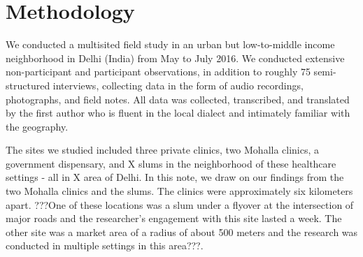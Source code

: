 \section{Methodology}

\begin{comment}
This should tell the story of what you did, and the single most important point is to show that you were reflective, rigorous, ethical, sound in your research. 
Start with where you conducted the study. Was there one site or many? How long was your (the authorsâ) engagement with this site? What was the nature of the engagement? And remember to anonymize by default.
Say what methods you used and who you studied. How long were your interviews? What kinds of questions did you ask? Did you use an interpreter? Who were these people? How old?
Add a paragraph on who the authors are and what they bring to the table. Say what their biases might have been that could be limitations of this work. Was there access you could not get? 
How did you analyze the data? If you used grounded theory, whose version of grounded theory did you use? Who was responsible for the analysis? 
Finally, there are lots of papers that have a decent write-up for methodology. Find a researcher you like and read up on the Methodology section.
\end{comment}

We conducted a multisited field study in an urban but low-to-middle income neighborhood in Delhi (India) from May to July 2016. We conducted extensive non-participant and participant observations, in addition to roughly 75 semi-structured interviews, collecting data in the form of audio recordings, photographs, and field notes. All data was collected, transcribed, and translated by the first author who is fluent in the local dialect and intimately familiar with the geography. 

The sites we studied included three private clinics, two Mohalla clinics, a government dispensary, and X slums in the neighborhood of these healthcare settings - all in X area of Delhi. In this note, we draw on our findings from the two Mohalla clinics and the slums. The clinics were approximately six kilometers apart. ???One of these locations was a slum under a flyover at the intersection of major roads and the researcher's engagement with this site lasted a week. The other site was a market area of a radius of about 500 meters and the research was conducted in multiple settings in this area???.

